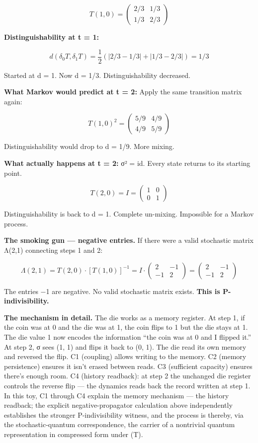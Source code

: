 \documentclass[
]{article}
\begin{document}
\[T(1,0) = \begin{pmatrix} 2/3 & 1/3 \\ 1/3 & 2/3 \end{pmatrix}\]

\textbf{Distinguishability at t = 1:}

\[d(\delta_0 T, \delta_1 T) = \frac{1}{2}(|2/3 - 1/3| + |1/3 - 2/3|) = 1/3\]

Started at d = 1. Now d = 1/3. Distinguishability decreased.

\textbf{What Markov would predict at t = 2:} Apply the same transition
matrix again:

\[T(1,0)^2 = \begin{pmatrix} 5/9 & 4/9 \\ 4/9 & 5/9 \end{pmatrix}\]

Distinguishability would drop to d = 1/9. More mixing.

\textbf{What actually happens at t = 2:} σ² = id. Every state returns to
its starting point.

\[T(2,0) = I = \begin{pmatrix} 1 & 0 \\ 0 & 1 \end{pmatrix}\]

Distinguishability is back to d = 1. Complete un-mixing. Impossible for
a Markov process.

\textbf{The smoking gun --- negative entries.} If there were a valid
stochastic matrix Λ(2,1) connecting steps 1 and 2:

\[\Lambda(2,1) = T(2,0) \cdot [T(1,0)]^{-1} = I \cdot \begin{pmatrix} 2 & -1 \\ -1 & 2 \end{pmatrix} = \begin{pmatrix} 2 & -1 \\ -1 & 2 \end{pmatrix}\]

The entries −1 are negative. No valid stochastic matrix exists.
\textbf{This is P-indivisibility.}

\textbf{The mechanism in detail.} The die works as a memory register. At
step 1, if the coin was at 0 and the die was at 1, the coin flips to 1
but the die stays at 1. The die value 1 now encodes the information
``the coin was at 0 and I flipped it.'' At step 2, σ sees (1, 1) and
flips it back to (0, 1). The die read its own memory and reversed the
flip. C1 (coupling) allows writing to the memory. C2 (memory
persistence) ensures it isn't erased between reads. C3 (sufficient
capacity) ensures there's enough room. C4 (history readback): at step 2
the unchanged die register controls the reverse flip --- the dynamics
reads back the record written at step 1. In this toy, C1 through C4
explain the memory mechanism --- the history readback; the explicit
negative-propagator calculation above independently establishes the
stronger P-indivisibility witness, and the process is thereby, via the
stochastic-quantum correspondence, the carrier of a nontrivial quantum
representation in compressed form under (T).
\end{document}
